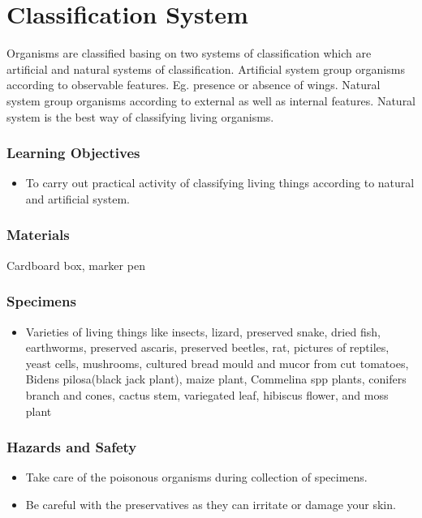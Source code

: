 \section{Classification System}
Organisms are classified basing on two systems of classification which are artificial and natural systems of classification. Artificial system group organisms according to observable features. Eg. presence or absence of wings. Natural system group organisms according to external as well as internal features. Natural system is the best way of classifying living organisms.

\subsubsection*{Learning Objectives}
\begin{itemize}
\item{To carry out practical activity of classifying living things according to natural and artificial system.}
\end{itemize}

\subsubsection*{Materials}
Cardboard box, marker pen

\subsubsection*{Specimens}
\begin{itemize}
\item{Varieties of living things like insects, lizard, preserved snake, dried fish, earthworms, preserved ascaris, preserved beetles, rat, pictures of reptiles, yeast cells, mushrooms, cultured bread mould and mucor from cut tomatoes, Bidens pilosa(black jack plant), maize plant, Commelina spp plants, conifers branch and cones, cactus stem, variegated leaf, hibiscus flower, and moss plant}
\end{itemize}

\subsubsection*{Hazards and Safety}
\begin{itemize}
\item{Take care of the poisonous organisms during collection of specimens.}
\item{Be careful with the preservatives as they can irritate or damage your skin.}
\end{itemize}

